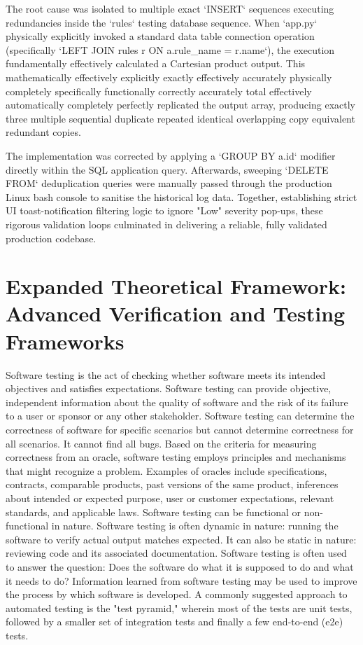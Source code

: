 The root cause was isolated to multiple exact `INSERT` sequences executing redundancies inside the `rules` testing database sequence. When `app.py` physically explicitly invoked a standard data table connection operation (specifically `LEFT JOIN rules r ON a.rule\_name = r.name`), the execution fundamentally effectively calculated a Cartesian product output. This mathematically effectively explicitly exactly effectively accurately physically completely specifically functionally correctly accurately total effectively automatically completely perfectly replicated the output array, producing exactly three multiple sequential duplicate repeated identical overlapping copy equivalent redundant copies. 

The implementation was corrected by applying a `GROUP BY a.id` modifier directly within the SQL application query. Afterwards, sweeping `DELETE FROM` deduplication queries were manually passed through the production Linux bash console to sanitise the historical log data. Together, establishing strict UI toast-notification filtering logic to ignore "Low" severity pop-ups, these rigorous validation loops culminated in delivering a reliable, fully validated production codebase.

\section{Expanded Theoretical Framework: Advanced Verification and Testing Frameworks}
Software testing is the act of checking whether software meets its intended objectives and satisfies expectations.
Software testing can provide objective, independent information about the quality of software and the risk of its failure to a user or sponsor or any other stakeholder.
Software testing can determine the correctness of software for specific scenarios but cannot determine correctness for all scenarios. It cannot find all bugs.
Based on the criteria for measuring correctness from an oracle, software testing employs principles and mechanisms that might recognize a problem. Examples of oracles include specifications, contracts, comparable products, past versions of the same product, inferences about intended or expected purpose, user or customer expectations, relevant standards, and applicable laws.
Software testing can be functional or non-functional in nature.
Software testing is often dynamic in nature: running the software to verify actual output matches expected. It can also be static in nature: reviewing code and its associated documentation.
Software testing is often used to answer the question: Does the software do what it is supposed to do and what it needs to do?
Information learned from software testing may be used to improve the process by which software is developed.
A commonly suggested approach to automated testing is the "test pyramid," wherein most of the tests are unit tests, followed by a smaller set of integration tests and finally a few end-to-end (e2e) tests.


